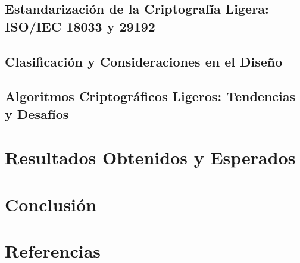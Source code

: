 \documentclass[a4paper,10pt]{article}
\begin{document}
	\subsection{Estandarización de la Criptografía Ligera: ISO/IEC 18033 y 29192}
	
	\subsection{Clasificación y Consideraciones en el Diseño}
	
	\subsection{Algoritmos Criptográficos Ligeros: Tendencias y Desafíos}
	
	\section{Resultados Obtenidos y Esperados}
	
	\section{Conclusión}
	
	\section{Referencias}
	\nocite{*}
	\printbibliography[heading=none]
\end{document}
